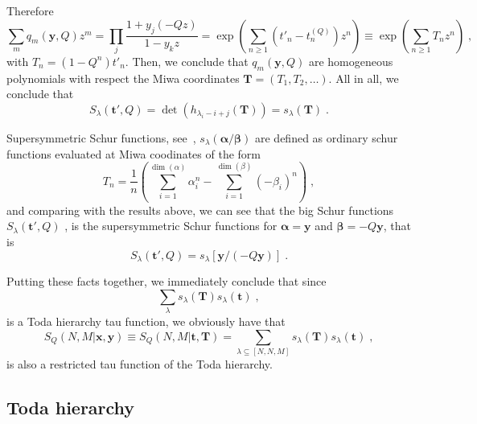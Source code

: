 \documentclass[a4paper,11pt]{amsart}
\begin{document}
Therefore 
\begin{equation}
 \sum_{m} q_m(\bm{y}, Q) z^m =
 \prod_j \frac{1 + y_j (-Q z)}{1 - y_k z}
 = \exp \left( \sum_{n\geq 1} (t'_n - t_n^{(Q)})z^n \right)
 \equiv \exp \left( \sum_{n\geq 1} T_n z^n \right)\; ,
\end{equation}
with \(T_n = (1 - Q^n) t'_n\). Then, we conclude that \(q_m(\bm{y}, Q)\)
are homogeneous polynomials with respect the Miwa coordinates
\(\bm{T} = (T_1, T_2, \dots)\). All in all, we conclude that 
\begin{equation}
  S_\lambda(\bm{t}', Q) = \det \left(h_{\lambda_i - i +j}(\bm{T})\right) = s_\lambda(\bm{T})\; .
\end{equation}

Supersymmetric Schur functions, see~\cite{Zinnjustin2009}, \(s_\lambda(\bm{\alpha}/\bm{\beta})\)
are defined as ordinary schur functions evaluated at Miwa coodinates
of the form
\begin{equation}
  T_n = \frac{1}{n} \left( \sum_{i=1}^{\dim(\alpha)} \alpha_i^n
       - \sum_{i=1}^{\dim(\beta)} (-\beta_i)^n\right)\; ,
\end{equation}
and comparing with the results above, we can see that the big Schur functions
\(S_\lambda(\bm{t}', Q)\)\; , is the supersymmetric Schur functions for \(\bm{\alpha} = \bm{y}\) 
and \(\bm{\beta} = - Q \bm{y}\), that is 
\begin{equation}
  S_\lambda(\bm{t}', Q) = s_\lambda[\bm{y}/(- Q\bm{y})]\; .
\end{equation}

Putting these facts together, we immediately conclude that since 
\begin{equation}
  \sum_\lambda s_\lambda(\bm{T}) s_\lambda (\bm{t}) \; ,
\end{equation}
is a Toda hierarchy tau function, we obviously have that 
\begin{equation}
  S_Q(N,M| \bm{x}, \bm{y}) \equiv S_Q(N,M| \bm{t}, \bm{T})
  = \sum_{\lambda \subseteq [N,N,M]} s_\lambda(\bm{T}) s_\lambda(\bm{t})\; , 
\end{equation}
is also a restricted tau function of the Toda hierarchy.


\subsection{Toda hierarchy}
\end{document}
